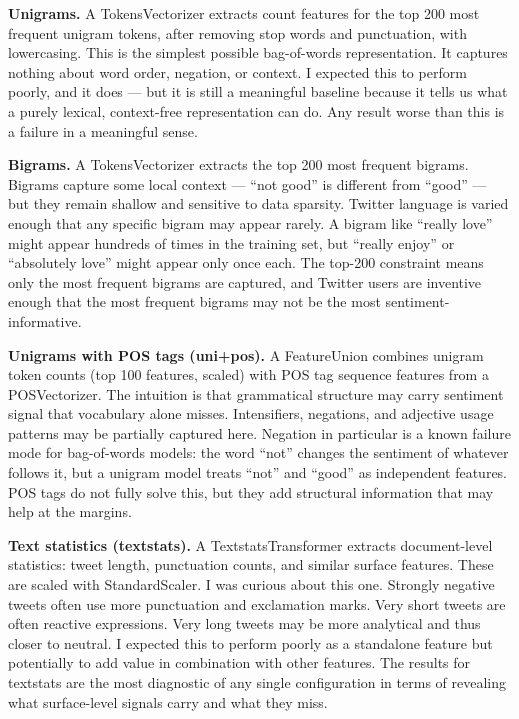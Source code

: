 \documentclass[12pt]{article}
\begin{document}
\textbf{Unigrams.} A TokensVectorizer extracts count features for the top 200 most frequent unigram tokens, after removing stop words and punctuation, with lowercasing. This is the simplest possible bag-of-words representation. It captures nothing about word order, negation, or context. I expected this to perform poorly, and it does --- but it is still a meaningful baseline because it tells us what a purely lexical, context-free representation can do. Any result worse than this is a failure in a meaningful sense.

\textbf{Bigrams.} A TokensVectorizer extracts the top 200 most frequent bigrams. Bigrams capture some local context --- ``not good'' is different from ``good'' --- but they remain shallow and sensitive to data sparsity. Twitter language is varied enough that any specific bigram may appear rarely. A bigram like ``really love'' might appear hundreds of times in the training set, but ``really enjoy'' or ``absolutely love'' might appear only once each. The top-200 constraint means only the most frequent bigrams are captured, and Twitter users are inventive enough that the most frequent bigrams may not be the most sentiment-informative.

\textbf{Unigrams with POS tags (uni+pos).} A FeatureUnion combines unigram token counts (top 100 features, scaled) with POS tag sequence features from a POSVectorizer. The intuition is that grammatical structure may carry sentiment signal that vocabulary alone misses. Intensifiers, negations, and adjective usage patterns may be partially captured here. Negation in particular is a known failure mode for bag-of-words models: the word ``not'' changes the sentiment of whatever follows it, but a unigram model treats ``not'' and ``good'' as independent features. POS tags do not fully solve this, but they add structural information that may help at the margins.

\textbf{Text statistics (textstats).} A TextstatsTransformer extracts document-level statistics: tweet length, punctuation counts, and similar surface features. These are scaled with StandardScaler. I was curious about this one. Strongly negative tweets often use more punctuation and exclamation marks. Very short tweets are often reactive expressions. Very long tweets may be more analytical and thus closer to neutral. I expected this to perform poorly as a standalone feature but potentially to add value in combination with other features. The results for textstats are the most diagnostic of any single configuration in terms of revealing what surface-level signals carry and what they miss.
\end{document}
